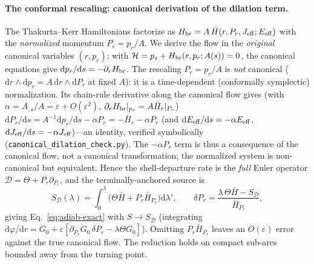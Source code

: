\documentclass[
    aps, prd, twocolumn, superscriptaddress,
    showpacs, nofootinbib, floatfix
]{revtex4-2}
\newcommand{\dd}{\mathrm{d}}
\begin{document}
\paragraph{The conformal rescaling: canonical derivation of the dilation term.}
The Thakurta--Kerr Hamiltonians factorize as $H_{\rm br}=A\,\bar H(r,P_r,J_{\rm
eff};E_{\rm eff})$ with the \emph{normalized} momentum $P_r=p_r/A$. We derive the flow in
the \emph{original} canonical variables $(r,p_r)$: with $\mathcal H=p_s+H_{\rm br}(r,p_r;A(s))=0$,
the canonical equations give $\dd p_r/\dd s=-\partial_r H_{\rm br}$. The rescaling
$P_r=p_r/A$ is \emph{not} canonical ($\dd r\wedge\dd p_r=A\,\dd r\wedge\dd P_r$ at fixed
$A$): it is a time-dependent (conformally symplectic) normalization. Its chain-rule
derivative along the canonical flow gives (with $\alpha=A_{,s}/A=\varepsilon+O(\varepsilon^2)$,
$\partial_r H_{\rm br}|_{p_r}=A\bar H_r|_{P_r}$) $\dd P_r/\dd s=A^{-1}\dd p_r/\dd s-\alpha
P_r=-\bar H_r-\alpha P_r$ (and $\dd E_{\rm eff}/\dd s=-\alpha E_{\rm eff}$, $\dd J_{\rm
eff}/\dd s=-\alpha J_{\rm eff}$)---an identity, verified symbolically
(\texttt{canonical\_dilation\_check.py}). The $-\alpha P_r$ term is thus a consequence of
the canonical flow, not a canonical transformation; the normalized system is non-canonical
but equivalent. Hence the shell-departure rate is the \emph{full} Euler operator
$\mathcal D=\Theta+P_r\partial_{P_r}$, and the terminally-anchored source is
\begin{equation}
    S_{\mathcal D}(\lambda)=\int_0^\lambda\big(\Theta\bar H+P_r\bar H_{P_r}\big)\dd\lambda',
    \qquad \delta P_r=\frac{\lambda\,\Theta\bar H-S_{\mathcal D}}{\bar H_{P_r}},
\end{equation}
giving Eq.~\eqref{eq:adiab-exact} with $S\to S_{\mathcal D}$ (integrating
$\dd\varphi/\dd r=G_0+\varepsilon[\partial_{P_r}G_0\,\delta P_r-\lambda\Theta G_0]$).
Omitting $P_r\bar H_{P_r}$ leaves an $O(\varepsilon)$ error against the true canonical
flow. The reduction holds on compact sub-arcs bounded away from the turning point.
\end{document}
